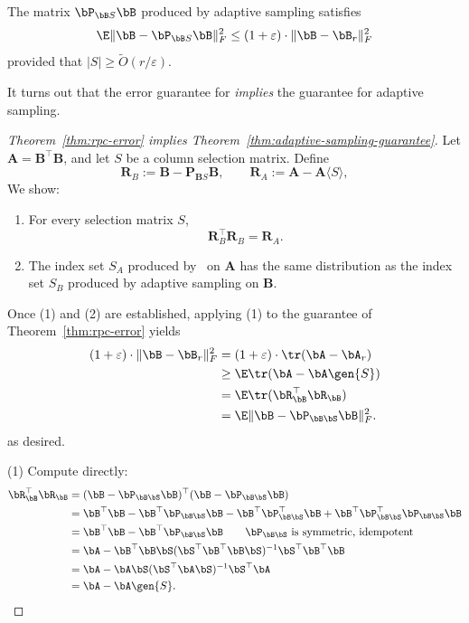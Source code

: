 \begin{theorem}
    \label{thm:adaptive-sampling-guarantee}
    The matrix $\bP_{\bB S}\bB$ produced by adaptive sampling satisfies
    \[\E\|\bB - \bP_{\bB S}\bB\|^2_F\leq (1 + \varepsilon)\cdot \|\bB - \bB_r\|^2_F\]
    provided that $|S|\geq \tilde O(r/\varepsilon)$.
\end{theorem}

It turns out that the error guarantee for \RPCholesky \textit{implies} the guarantee for adaptive sampling.

\begin{proof}[Theorem~\ref{thm:rpc-error} implies Theorem~\ref{thm:adaptive-sampling-guarantee}]

Let $\mathbf{A}=\mathbf{B}^\top\mathbf{B}$, and let $S$ be a column selection matrix. Define
\[
\mathbf{R}_B := \mathbf{B}-\mathbf{P}_{\mathbf{B}S}\mathbf{B},
\qquad
\mathbf{R}_A := \mathbf{A}-\mathbf{A}\langle S\rangle,
\]
We show:
\begin{enumerate}
\item For every selection matrix $S$,
\[
\mathbf{R}_B^\top \mathbf{R}_B = \mathbf{R}_A.
\]
\item The index set $S_A$ produced by \RPCholesky\ on $\mathbf{A}$ has the same distribution as the index set $S_B$ produced by adaptive sampling on $\mathbf{B}$.
\end{enumerate}

Once (1) and (2) are established, applying (1) to the guarantee of Theorem~\ref{thm:rpc-error} yields
\begin{align*}
    (1+\varepsilon)\cdot \|\bB - \bB_r\|^2_F &= (1+\varepsilon)\cdot \tr(\bA - \bA_r)\\
    &\geq \E\tr(\bA-\bA\gen{S})\\
    &=\E\tr(\bR_\bB^\top \bR_\bB)\\
    &= \E\|\bB-\bP_{\bB\bS}\bB\|^2_F.
\end{align*}
as desired.

\vspace{1em}
\noindent
(1) Compute directly:
\begin{align*}
    \bR_{\bB}^\top\bR_{\bB} &= (\bB-\bP_{\bB\bS}\bB)^\top(\bB-\bP_{\bB\bS}\bB)\\
    &= \bB^\top\bB - \bB^\top\bP_{\bB\bS}\bB - \bB^\top\bP_{\bB\bS}^\top\bB +\bB^\top\bP_{\bB\bS}^\top\bP_{\bB\bS}\bB\\
    &=\bB^\top\bB - \bB^\top\bP_{\bB\bS}\bB\qquad\text{$\bP_{\bB\bS}$ is symmetric, idempotent}\\
    &= \bA - \bB^\top\bB\bS(\bS^\top\bB^\top\bB\bS)^{-1}\bS^\top\bB^\top\bB\\
    &= \bA - \bA\bS(\bS^\top\bA\bS)^{-1}\bS^\top\bA\\
    &= \bA - \bA\gen{S}.
\end{align*}


\end{proof}
